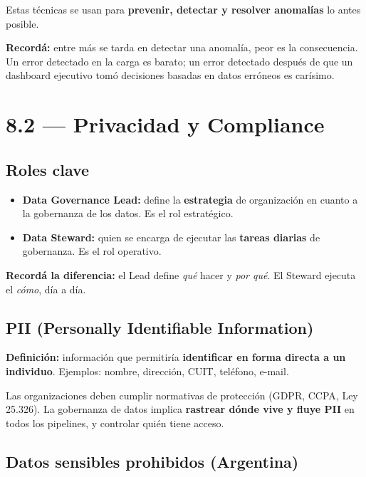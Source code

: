 \documentclass[11pt, a4paper]{article}
\begin{document}
Estas técnicas se usan para \textbf{prevenir, detectar y resolver anomalías} lo antes posible.

\begin{recallbox}
	\textbf{Recordá:} entre más se tarda en detectar una anomalía, peor es la consecuencia. Un error detectado en la carga es barato; un error detectado después de que un dashboard ejecutivo tomó decisiones basadas en datos erróneos es carísimo.
\end{recallbox}

\section{8.2 — Privacidad y Compliance}

\subsection{Roles clave}
\begin{itemize}
	\item \textbf{Data Governance Lead:} define la \textbf{estrategia} de organización en cuanto a la gobernanza de los datos. Es el rol estratégico.
	\item \textbf{Data Steward:} quien se encarga de ejecutar las \textbf{tareas diarias} de gobernanza. Es el rol operativo.
\end{itemize}

\begin{recallbox}
	\textbf{Recordá la diferencia:} el Lead define \textit{qué} hacer y \textit{por qué}. El Steward ejecuta el \textit{cómo}, día a día.
\end{recallbox}

\subsection{PII (Personally Identifiable Information)}

\textbf{Definición:} información que permitiría \textbf{identificar en forma directa a un individuo}. Ejemplos: nombre, dirección, CUIT, teléfono, e-mail.

Las organizaciones deben cumplir normativas de protección (GDPR, CCPA, Ley 25.326). La gobernanza de datos implica \textbf{rastrear dónde vive y fluye PII} en todos los pipelines, y controlar quién tiene acceso.

\subsection{Datos sensibles prohibidos (Argentina)}
\end{document}
